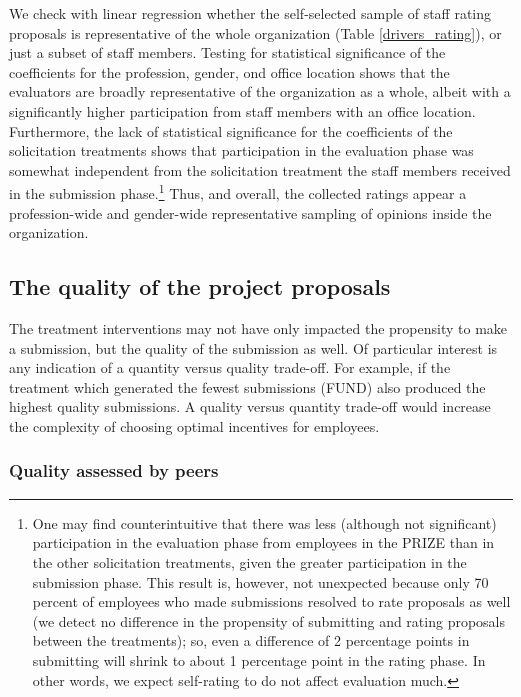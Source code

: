 \documentclass[12pt, titlepage]{article}
\begin{document}
We check with linear regression whether the self-selected sample of
staff rating proposals is representative of the whole organization
(Table \ref{drivers_rating}), or just a subset of staff members. Testing
for statistical significance of the coefficients for the profession,
gender, ond office location shows that the evaluators are broadly
representative of the organization as a whole, albeit with a
significantly higher participation from staff members with an office
location. Furthermore, the lack of statistical significance for the
coefficients of the solicitation treatments shows that participation in
the evaluation phase was somewhat independent from the solicitation
treatment the staff members received in the submission phase.\footnote{One
  may find counterintuitive that there was less (although not
  significant) participation in the evaluation phase from employees in
  the PRIZE than in the other solicitation treatments, given the greater
  participation in the submission phase. This result is, however, not
  unexpected because only 70 percent of employees who made submissions
  resolved to rate proposals as well (we detect no difference in the
  propensity of submitting and rating proposals between the treatments);
  so, even a difference of 2 percentage points in submitting will shrink
  to about 1 percentage point in the rating phase. In other words, we
  expect self-rating to do not affect evaluation much.} Thus, and
overall, the collected ratings appear a profession-wide and gender-wide
representative sampling of opinions inside the organization.

\subsection{The quality of the project
proposals}\label{the-quality-of-the-project-proposals}

The treatment interventions may not have only impacted the propensity to
make a submission, but the quality of the submission as well. Of
particular interest is any indication of a quantity versus quality
trade-off. For example, if the treatment which generated the fewest
submissions (FUND) also produced the highest quality submissions. A
quality versus quantity trade-off would increase the complexity of
choosing optimal incentives for employees.

\subsubsection{Quality assessed by
peers}\label{quality-assessed-by-peers}
\end{document}
